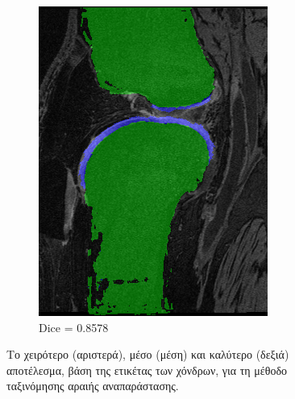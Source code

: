 \documentclass[a4paper,12pt]{article}
\begin{document}
\begin{figure}[H]
\begin{subfigure}[b]{0.32\linewidth}
    \includegraphics[width=\linewidth]{final_SRC_best.png}
    \caption{Dice = 0.8578}
    \end{subfigure}

    \caption{Το χειρότερο (αριστερά), μέσο (μέση) και καλύτερο (δεξιά)
             αποτέλεσμα, βάση της ετικέτας των χόνδρων, για τη μέθοδο
             ταξινόμησης αραιής αναπαράστασης.}
    \label{fig:final_dice_SRC}
\end{figure}
\end{document}
